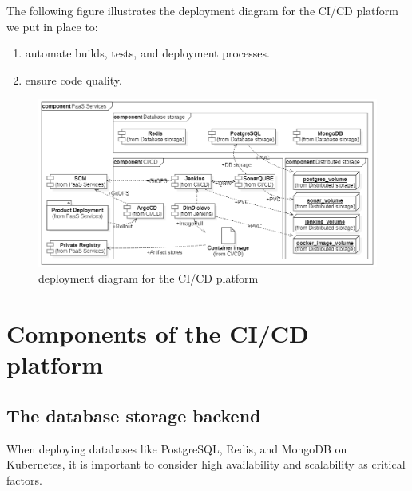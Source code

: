 The following figure illustrates the deployment diagram for the CI/CD platform we put in place to: 
\begin{enumerate}[label = (\arabic*)]
\item automate builds, tests, and deployment processes. 
\item ensure code quality. 
\end{enumerate}

\begin{figure}[H]\centering
\includegraphics[width=1.0\textwidth,angle=00]{assets/f34.png}
\caption{deployment diagram for the CI/CD platform }
\label{fig:deployment diagram for the CI/CD platform}
\end{figure}

\section{Components of the CI/CD platform }

\subsection{The database storage backend }

When deploying databases like PostgreSQL, Redis, and MongoDB on Kubernetes, it is important to consider high availability and scalability as critical factors. 

